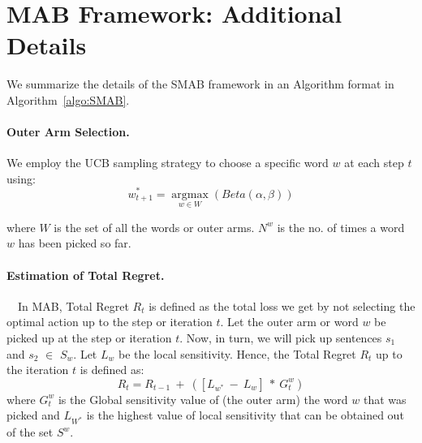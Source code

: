 
\section{MAB Framework: Additional Details}
\label{sec:appendix_SMAB}
We summarize the details of the SMAB framework in an Algorithm format in Algorithm~\ref{algo:SMAB}. 

\paragraph{Outer Arm Selection.} We employ the UCB sampling strategy to choose a specific word $w$ at each step $t$ using:
\begin{equation*}
    w^*_{t+1} = \operatorname*{argmax}_{w \in W} \left( Beta(\alpha, \beta) \right)
\end{equation*}

where $W$ is the set of all the words or outer arms. $N^w$ is the no. of times a word $w$ has been picked so far. 

\paragraph{Estimation of Total Regret.}~~In MAB, Total Regret $R_t$ is defined as the total loss we get by not selecting the optimal action up to the step or iteration $t$. Let the outer arm or word $w$ be picked up at the step or iteration $t$. Now, in turn, we will pick up sentences $s_1$ and $s_2$ $\in$ $S_w$. Let $L_w$ be the local sensitivity. Hence, the Total Regret $R_t$ up to the iteration $t$ is defined as:
\begin{equation}
    R_t = R_{t-1} \: + \: ([L_{w^*}\: - \: L_w] \: * \: G^w_t)
\end{equation}
where $G^w_t$ is the Global sensitivity value of (the outer arm) the word $w$ that was picked and $L_{W^*}$ is the highest value of local sensitivity that can be obtained out of the set $S^{w}$.

